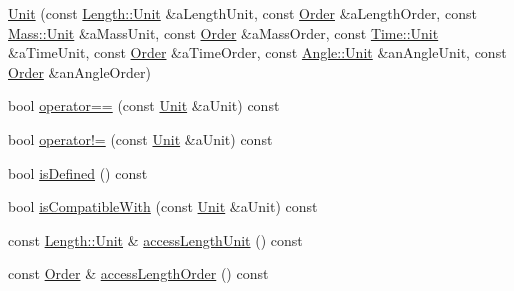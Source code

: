 \begin{DoxyCompactItemize}
\item 
\hyperlink{classlibrary_1_1physics_1_1units_1_1_derived_1_1_unit_afae7260b526cdd8379eda7e69d7b42b8}{Unit} (const \hyperlink{classlibrary_1_1physics_1_1units_1_1_length_a3b8b39cd245cf6b19dc34459baeccb18}{Length\+::\+Unit} \&a\+Length\+Unit, const \hyperlink{classlibrary_1_1physics_1_1units_1_1_derived_1_1_order}{Order} \&a\+Length\+Order, const \hyperlink{classlibrary_1_1physics_1_1units_1_1_mass_a95f1e0434bc16794926b8e273bc2a54b}{Mass\+::\+Unit} \&a\+Mass\+Unit, const \hyperlink{classlibrary_1_1physics_1_1units_1_1_derived_1_1_order}{Order} \&a\+Mass\+Order, const \hyperlink{classlibrary_1_1physics_1_1units_1_1_time_ab876a6a05c9a2f28905f2753bfd64109}{Time\+::\+Unit} \&a\+Time\+Unit, const \hyperlink{classlibrary_1_1physics_1_1units_1_1_derived_1_1_order}{Order} \&a\+Time\+Order, const \hyperlink{classlibrary_1_1physics_1_1units_1_1_angle_a3c329d415a61783b16ce481874cc5956}{Angle\+::\+Unit} \&an\+Angle\+Unit, const \hyperlink{classlibrary_1_1physics_1_1units_1_1_derived_1_1_order}{Order} \&an\+Angle\+Order)
\item 
bool \hyperlink{classlibrary_1_1physics_1_1units_1_1_derived_1_1_unit_a207d8431c78316e5fd209ebb9441775f}{operator==} (const \hyperlink{classlibrary_1_1physics_1_1units_1_1_derived_1_1_unit}{Unit} \&a\+Unit) const
\item 
bool \hyperlink{classlibrary_1_1physics_1_1units_1_1_derived_1_1_unit_abe02f07604a605c6f9c526599328bf37}{operator!=} (const \hyperlink{classlibrary_1_1physics_1_1units_1_1_derived_1_1_unit}{Unit} \&a\+Unit) const
\item 
bool \hyperlink{classlibrary_1_1physics_1_1units_1_1_derived_1_1_unit_adc1896bc12e75e2e8a08eb06cdcac434}{is\+Defined} () const
\item 
bool \hyperlink{classlibrary_1_1physics_1_1units_1_1_derived_1_1_unit_a44a173b22d6c9c26bfbbc4291cd00cc8}{is\+Compatible\+With} (const \hyperlink{classlibrary_1_1physics_1_1units_1_1_derived_1_1_unit}{Unit} \&a\+Unit) const
\item 
const \hyperlink{classlibrary_1_1physics_1_1units_1_1_length_a3b8b39cd245cf6b19dc34459baeccb18}{Length\+::\+Unit} \& \hyperlink{classlibrary_1_1physics_1_1units_1_1_derived_1_1_unit_a39a4cbff8b3e4347a4744e788198ad4d}{access\+Length\+Unit} () const
\item 
const \hyperlink{classlibrary_1_1physics_1_1units_1_1_derived_1_1_order}{Order} \& \hyperlink{classlibrary_1_1physics_1_1units_1_1_derived_1_1_unit_ae7afd674029bece3fa430f96d378472f}{access\+Length\+Order} () const

\end{DoxyCompactItemize}

